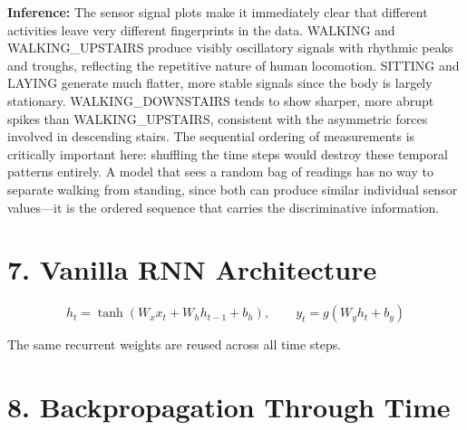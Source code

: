 \documentclass[10pt]{article}
\begin{document}
\textbf{Inference:}
The sensor signal plots make it immediately clear that different activities
leave very different fingerprints in the data. WALKING and WALKING\_UPSTAIRS
produce visibly oscillatory signals with rhythmic peaks and troughs,
reflecting the repetitive nature of human locomotion. SITTING and LAYING
generate much flatter, more stable signals since the body is largely
stationary. WALKING\_DOWNSTAIRS tends to show sharper, more abrupt spikes
than WALKING\_UPSTAIRS, consistent with the asymmetric forces involved in
descending stairs. The sequential ordering of measurements is critically
important here: shuffling the time steps would destroy these temporal
patterns entirely. A model that sees a random bag of readings has no way
to separate walking from standing, since both can produce similar individual
sensor values---it is the ordered sequence that carries the discriminative
information.

\section*{7. Vanilla RNN Architecture}

\[
h_t=\tanh(W_xx_t+W_hh_{t-1}+b_h), \qquad y_t=g(W_yh_t+b_y)
\]

\begin{center}
\end{center}

The same recurrent weights are reused across all time steps.

\section*{8. Backpropagation Through Time}

\begin{center}
\end{center}
\end{document}
